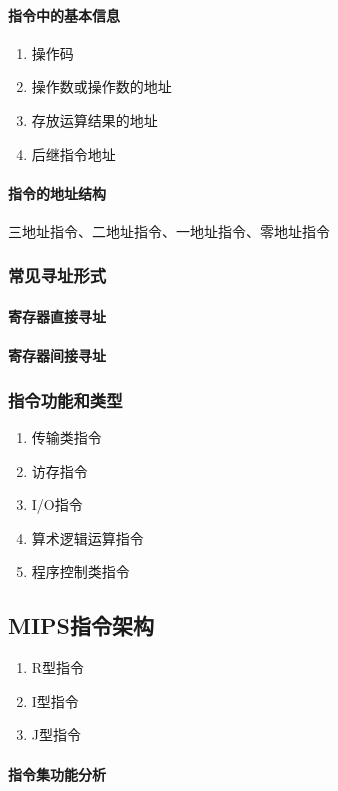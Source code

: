 \documentclass[a4paper, 12pt, oneside]{ctexart}
\begin{document}
	\paragraph{指令中的基本信息}
	\begin{enumerate}
		\item 操作码
		\item 操作数或操作数的地址
		\item 存放运算结果的地址
		\item 后继指令地址
	\end{enumerate}
	\paragraph{指令的地址结构}
	三地址指令、二地址指令、一地址指令、零地址指令
	\subsubsection{常见寻址形式}
	\paragraph{寄存器直接寻址}
	\paragraph{寄存器间接寻址}
	\subsubsection{指令功能和类型}
	\begin{enumerate}
		\item 传输类指令
		\item 访存指令
		\item I/O指令
		\item 算术逻辑运算指令
		\item 程序控制类指令
	\end{enumerate}
	\subsection{MIPS指令架构}
	\begin{enumerate}
		\item R型指令
		\item I型指令
		\item J型指令
	\end{enumerate}
	\paragraph{指令集功能分析}
\end{document}
